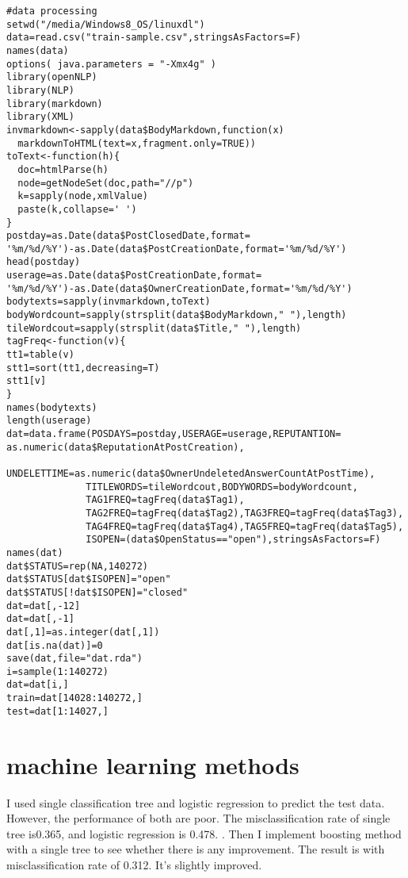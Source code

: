 \documentclass[12pt,a4paper]{article}
\begin{document}
\begin{verbatim}
#data processing
setwd("/media/Windows8_OS/linuxdl")
data=read.csv("train-sample.csv",stringsAsFactors=F)
names(data)
options( java.parameters = "-Xmx4g" )
library(openNLP)
library(NLP)
library(markdown)
library(XML)
invmarkdown<-sapply(data$BodyMarkdown,function(x)
  markdownToHTML(text=x,fragment.only=TRUE))
toText<-function(h){
  doc=htmlParse(h)
  node=getNodeSet(doc,path="//p")
  k=sapply(node,xmlValue)
  paste(k,collapse=' ')
}
postday=as.Date(data$PostClosedDate,format=
'%m/%d/%Y')-as.Date(data$PostCreationDate,format='%m/%d/%Y')
head(postday)
userage=as.Date(data$PostCreationDate,format=
'%m/%d/%Y')-as.Date(data$OwnerCreationDate,format='%m/%d/%Y')
bodytexts=sapply(invmarkdown,toText)
bodyWordcount=sapply(strsplit(data$BodyMarkdown," "),length)
tileWordcout=sapply(strsplit(data$Title," "),length)
tagFreq<-function(v){
tt1=table(v)
stt1=sort(tt1,decreasing=T)
stt1[v]
}
names(bodytexts)
length(userage)
dat=data.frame(POSDAYS=postday,USERAGE=userage,REPUTANTION=
as.numeric(data$ReputationAtPostCreation),
              UNDELETTIME=as.numeric(data$OwnerUndeletedAnswerCountAtPostTime),
              TITLEWORDS=tileWordcout,BODYWORDS=bodyWordcount,
              TAG1FREQ=tagFreq(data$Tag1),
              TAG2FREQ=tagFreq(data$Tag2),TAG3FREQ=tagFreq(data$Tag3),
              TAG4FREQ=tagFreq(data$Tag4),TAG5FREQ=tagFreq(data$Tag5),
              ISOPEN=(data$OpenStatus=="open"),stringsAsFactors=F)
names(dat)
dat$STATUS=rep(NA,140272)
dat$STATUS[dat$ISOPEN]="open"
dat$STATUS[!dat$ISOPEN]="closed"
dat=dat[,-12]
dat=dat[,-1]
dat[,1]=as.integer(dat[,1])
dat[is.na(dat)]=0
save(dat,file="dat.rda")
i=sample(1:140272)
dat=dat[i,]
train=dat[14028:140272,]
test=dat[1:14027,]

\end{verbatim}


\section {machine learning methods}
I used single classification tree and logistic regression to predict the test data. However, the performance of both are poor. The misclassification rate of single tree is0.365, and logistic regression is 0.478.
. Then I implement boosting method with a single tree to see whether there is any improvement. The result is with misclassification rate of 0.312. It's slightly improved.
\end{document}
